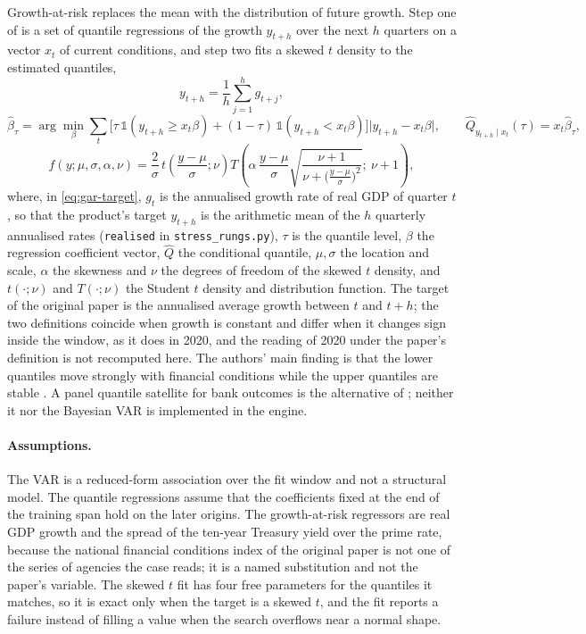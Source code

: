 Growth-at-risk replaces the mean with the distribution of future growth. Step one of \citet{aggregation-stress:abg2019} is a set
of quantile regressions of the growth $y_{t+h}$ over the next $h$ quarters on a vector $x_t$ of current
conditions, and step two fits a skewed $t$ density to the estimated quantiles,
\begin{equation}
y_{t+h}=\frac1h\sum_{j=1}^{h}g_{t+j},
\label{eq:gar-target}
\end{equation}
\begin{equation}
\hat\beta_\tau=\arg\min_{\beta}\sum_t\bigl[\tau\,\mathbb{1}(y_{t+h}\ge x_t\beta)+(1-\tau)\,\mathbb{1}(y_{t+h}<x_t\beta)\bigr]\lvert y_{t+h}-x_t\beta\rvert,\qquad
\hat Q_{y_{t+h}\mid x_t}(\tau)=x_t\hat\beta_\tau,
\label{eq:gar-quantile}
\end{equation}
\begin{equation}
f(y;\mu,\sigma,\alpha,\nu)=\frac{2}{\sigma}\,t\!\left(\frac{y-\mu}{\sigma};\nu\right)T\!\left(\alpha\,\frac{y-\mu}{\sigma}\sqrt{\frac{\nu+1}{\nu+\bigl(\tfrac{y-\mu}{\sigma}\bigr)^{2}}};\ \nu+1\right),
\label{eq:gar-skewt}
\end{equation}
where, in \cref{eq:gar-target}, $g_t$ is the annualised growth rate of real GDP of quarter $t$, so that the product's target $y_{t+h}$ is the arithmetic mean of
the $h$ quarterly annualised rates (\texttt{realised} in \texttt{stress\_\allowbreak rungs.\allowbreak py}), $\tau$ is the quantile level, $\beta$ the regression coefficient vector, $\hat Q$ the conditional quantile, $\mu,\sigma$ the
location and scale, $\alpha$ the skewness and $\nu$ the degrees of freedom of the skewed $t$ density, and $t(\cdot;\nu)$ and
$T(\cdot;\nu)$ the Student $t$ density and distribution function. The target of the original paper is the annualised average
growth between $t$ and $t+h$; the two definitions coincide when growth is constant and differ when it changes sign inside the window,
as it does in 2020, and the reading of 2020 under the paper's definition is not recomputed here. The authors' main finding is that the lower quantiles move
strongly with financial conditions while the upper quantiles are stable \citep{aggregation-stress:abg2019}. A panel quantile
satellite for bank outcomes is the alternative of \citet{aggregation-stress:covas2014}; neither it nor the Bayesian VAR is
implemented in the engine.

\paragraph{Assumptions.}
The VAR is a reduced-form association over the fit window and not a structural model. The quantile regressions assume that the
coefficients fixed at the end of the training span hold on the later origins. The growth-at-risk regressors are real GDP growth
and the spread of the ten-year Treasury yield over the prime rate, because the national financial conditions index of the
original paper is not one of the series of agencies the case reads; it is a named substitution and not the paper's variable.
The skewed $t$ fit has four free parameters for the quantiles it matches, so it is exact only when the target is a skewed $t$,
and the fit reports a failure instead of filling a value when the search overflows near a normal shape.

